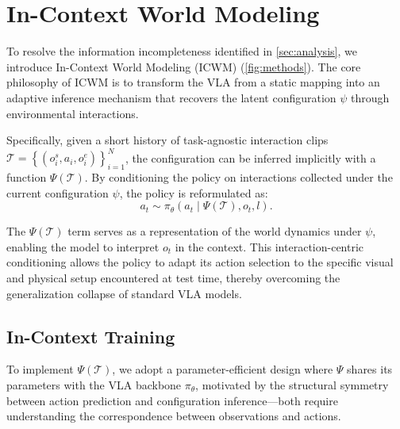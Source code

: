 \section{In-Context World Modeling}
\label{sec:method}

To resolve the information incompleteness identified in \autoref{sec:analysis}, we introduce In-Context World Modeling (ICWM) (\autoref{fig:methods}). The core philosophy of ICWM is to transform the VLA from a static mapping into an adaptive inference mechanism that recovers the latent configuration $\psi$ through environmental interactions. 

Specifically, given a short history of task-agnostic interaction clips $\mathcal{T} = \left\{\left(o^s_i, a_i, o^e_i\right) \right\}_{i=1}^{N}$, the configuration can be inferred implicitly with a function $\Psi\left(\mathcal{T}\right)$. By conditioning the policy on interactions collected under the current configuration $\psi$, the policy is reformulated as:
\begin{equation}
a_t \sim \pi_\theta\left(a_t \mid \Psi \left(\mathcal{T}\right), o_t, l\right).
\end{equation}

The $\Psi\left(\mathcal{T}\right)$ term serves as a representation of the world dynamics under $\psi$, enabling the model to interpret $o_t$ in the context. This interaction-centric conditioning allows the policy to adapt its action selection to the specific visual and physical setup encountered at test time, thereby overcoming the generalization collapse of standard VLA models.


\subsection{In-Context Training}
\label{subsec:training}

To implement $\Psi\left(\mathcal{T}\right)$, we adopt a parameter-efficient design where $\Psi$ 
shares its parameters with the VLA backbone $\pi_\theta$, motivated by the structural symmetry between action prediction and configuration inference—both require understanding the correspondence between observations and actions. 


